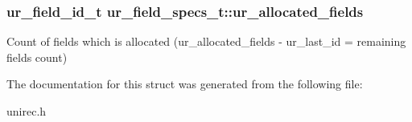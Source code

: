 \subsubsection[{\texorpdfstring{ur\+\_\+allocated\+\_\+fields}{ur\_allocated\_fields}}]{\setlength{\rightskip}{0pt plus 5cm}ur\+\_\+field\+\_\+id\+\_\+t ur\+\_\+field\+\_\+specs\+\_\+t\+::ur\+\_\+allocated\+\_\+fields}\hypertarget{structur__field__specs__t_abe745769ca4dd67bf653de0687033da9}{}\label{structur__field__specs__t_abe745769ca4dd67bf653de0687033da9}
Count of fields which is allocated (ur\+\_\+allocated\+\_\+fields -\/ ur\+\_\+last\+\_\+id = remaining fields count) 

The documentation for this struct was generated from the following file\+:\begin{DoxyCompactItemize}
\item 
unirec.\+h\end{DoxyCompactItemize}
